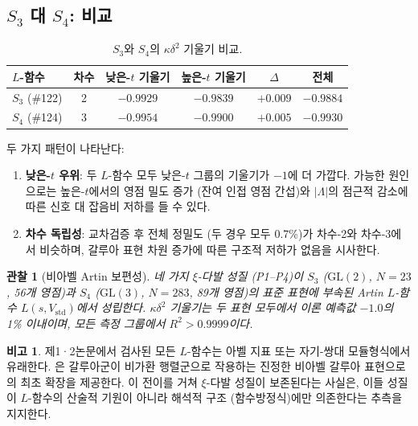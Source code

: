\documentclass[11pt, a4paper]{article}
\theoremstyle{plain}
\newtheorem{observation}[theorem]{관찰}
\theoremstyle{definition}
\newtheorem{remark}{비고}[section]
\newcommand{\abs}[1]{\left|#1\right|}
\newcommand{\Lam}{\Lambda}             %
\newcommand{\kap}{\kappa}             %
\begin{document}
\subsection{$S_{3}$ 대 $S_{4}$: 비교}
\label{sec:artin-compare}

\begin{table}[ht]
\centering
\caption{$S_{3}$와 $S_{4}$의 $\kap\delta^{2}$ 기울기 비교.}
\label{tab:artin-compare}
\begin{tabular}{@{}lccccc@{}}
\toprule
$L$-\textbf{함수} & \textbf{차수} & \textbf{낮은-$t$ 기울기}
  & \textbf{높은-$t$ 기울기} & \textbf{$\Delta$} & \textbf{전체} \\
\midrule
$S_{3}$ (\#122) & 2 & $-0.9929$ & $-0.9839$ & $+0.009$ & $-0.9884$ \\
$S_{4}$ (\#124) & 3 & $-0.9954$ & $-0.9900$ & $+0.005$ & $-0.9930$ \\
\bottomrule
\end{tabular}
\end{table}

두 가지 패턴이 나타난다:
\begin{enumerate}
  \item \textbf{낮은-$t$ 우위}: 두 $L$-함수 모두 낮은-$t$ 그룹의 기울기가
    $-1$에 더 가깝다. 가능한 원인으로는 높은-$t$에서의 영점 밀도 증가
    (잔여 인접 영점 간섭)와 $\abs{\Lam}$의 점근적 감소에 따른
    신호 대 잡음비 저하를 들 수 있다.
  \item \textbf{차수 독립성}: 교차검증 후 전체 정밀도 (두 경우 모두 0.7\%)가
    차수-2와 차수-3에서 비슷하며, 갈루아 표현 차원 증가에 따른
    구조적 저하가 없음을 시사한다.
\end{enumerate}

\begin{observation}[비아벨 Artin 보편성]\label{obs:artin}
네 가지 $\xi$-다발 성질 \textnormal{(P1--P4)}이
$S_{3}$ \textnormal{(}$\mathrm{GL}(2)$, $N=23$,
56개 영점\textnormal{)}과 $S_{4}$ \textnormal{(}$\mathrm{GL}(3)$,
$N=283$, 89개 영점\textnormal{)}의 표준 표현에 부속된
Artin $L$-함수 $L(s, V_{\mathrm{std}})$에서 성립한다.
$\kap\delta^{2}$ 기울기는 두 표현 모두에서 이론 예측값 $-1.0$의
1\% 이내이며, 모든 측정 그룹에서 $R^{2} > 0.9999$이다.
\end{observation}

\begin{remark}\label{rem:previous}
제1·2논문에서 검사된 모든 $L$-함수는 아벨 지표 또는 자기-쌍대 모듈형식에서 유래한다.
은 갈루아군이 비가환 행렬군으로 작용하는 진정한 비아벨 갈루아 표현으로의
최초 확장을 제공한다. 이 전이를 거쳐 $\xi$-다발 성질이 보존된다는 사실은,
이들 성질이 $L$-함수의 산술적 기원이 아니라 해석적 구조
\textnormal{(}함수방정식\textnormal{)}에만 의존한다는 추측을 지지한다.
\end{remark}
\end{document}
